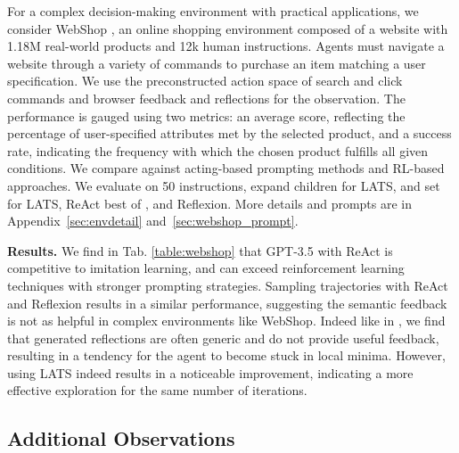 \documentclass{article} \usepackage{iclr2024_conference,times}
\begin{document}
For a complex decision-making environment with practical applications, we consider WebShop \citep{yao2022webshop}, an online shopping environment composed of a website with 1.18M real-world products and 12k human instructions. Agents must navigate a website through a variety of commands to purchase an item matching a user specification. We use the preconstructed action space of search and click commands and browser feedback and reflections for the observation. The performance is gauged using two metrics: an average score, reflecting the percentage of user-specified attributes met by the selected product, and a success rate, indicating the frequency with which the chosen product fulfills all given conditions. We compare against acting-based prompting methods and RL-based approaches. We evaluate on 50 instructions, expand  children for LATS, and set  for LATS, ReAct best of , and Reflexion. More details and prompts are in Appendix~\ref{sec:envdetail} and~\ref{sec:webshop_prompt}.

\textbf{Results.} We find in Tab. \ref{table:webshop} that GPT-3.5 with ReAct is competitive to imitation learning, and can exceed reinforcement learning techniques with stronger prompting strategies. Sampling  trajectories with ReAct and Reflexion results in a similar performance, suggesting the semantic feedback is not as helpful in complex environments like WebShop. Indeed like in \citet{shinn2023reflexion}, we find that generated reflections are often generic and do not provide useful feedback, resulting in a tendency for the agent to become stuck in local minima. However, using LATS indeed results in a noticeable improvement, indicating a more effective exploration for the same number of iterations.

\subsection{Additional Observations}
\end{document}
